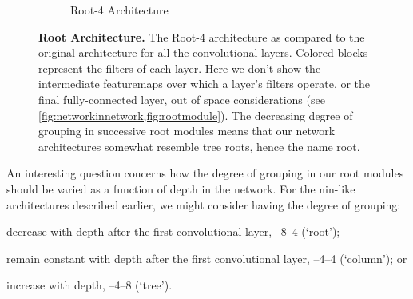 \documentclass[thesis]{subfiles}
\begin{document}
{\begin{landscape}
\begin{figure}[p]
\begin{subfigure}[b]{0.98\linewidth}
			\caption{Root-4 Architecture}
			\label{fig:root4topology}
		\end{subfigure}
		\caption[ standard \vs root architecture]{\textbf{ Root Architecture.} The Root-4 architecture as compared to the original architecture for all the convolutional layers. Colored blocks represent the filters of each layer. Here we don't show the intermediate \glspl{featuremap} over which a layer's filters operate, or the final fully-connected layer, out of space considerations (see \cref{fig:networkinnetwork,fig:rootmodule}). The decreasing degree of grouping in successive root modules means that our network architectures somewhat resemble tree roots, hence the name root.
		}\label{fig:networktopology}
	\end{figure}
	\end{landscape}
	}
	An interesting question concerns how the degree of grouping in our root modules should be varied as a function of depth in the network. For the \gls{nin}-like architectures described earlier, we might consider having the degree of grouping:
	\begin{enumerate*}[label= (\textbf{\roman*})]
		\item decrease with depth after the first convolutional layer, --8--4 (`root');
		\item remain constant with depth after the first convolutional layer, --4--4 (`column'); or
		\item increase with depth, --4--8 (`tree').
	\end{enumerate*}
	
\end{document}
